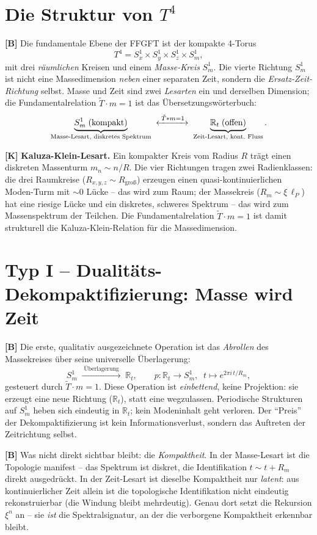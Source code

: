 \section{Die Struktur von $T^4$}

\textbf{[B]} Die fundamentale Ebene der FFGFT ist der kompakte 4-Torus
\[
  T^4 = S^1_x\times S^1_y\times S^1_z\times S^1_m,
\]
mit drei \emph{räumlichen} Kreisen und einem \emph{Masse-Kreis} $S^1_m$. Die
vierte Richtung $S^1_m$ ist nicht eine Massedimension \emph{neben} einer
separaten Zeit, sondern die \emph{Ersatz-Zeit-Richtung} selbst. Masse und Zeit
sind zwei \emph{Lesarten} ein und derselben Dimension; die Fundamentalrelation
$\tilde T\cdot m=1$ ist das Übersetzungswörterbuch:
\[
  \underbrace{S^1_m\;(\text{kompakt})}_{\text{Masse-Lesart, diskretes Spektrum}}
  \;\xleftrightarrow{\;\tilde T\cdot m=1\;}\;
  \underbrace{\mathbb{R}_t\;(\text{offen})}_{\text{Zeit-Lesart, kont.\ Fluss}}.
\]

\textbf{[K]} \textbf{Kaluza-Klein-Lesart.} Ein kompakter Kreis vom Radius $R$
trägt einen diskreten Massenturm $m_n\sim n/R$. Die vier Richtungen tragen zwei
Radienklassen: die drei Raumkreise ($R_{x,y,z}\sim R_\text{groß}$) erzeugen einen
quasi-kontinuierlichen Moden-Turm mit $\sim0$ Lücke -- das wird zum Raum; der
Massekreis ($R_m\sim\xi\,\ell_P$) hat eine riesige Lücke und ein diskretes,
schweres Spektrum -- das wird zum Massenspektrum der Teilchen. Die
Fundamentalrelation $\tilde T\cdot m=1$ ist damit strukturell die
Kaluza-Klein-Relation für die Massedimension.

\section{Typ I -- Dualitäts-Dekompaktifizierung: Masse wird Zeit}

\textbf{[B]} Die erste, qualitativ ausgezeichnete Operation ist das \emph{Abrollen}
des Massekreises über seine universelle Überlagerung:
\[
  S^1_m\;\xrightarrow{\;\text{Überlagerung}\;}\;\mathbb{R}_t,
  \qquad p:\mathbb{R}_t\to S^1_m,\;\;t\mapsto e^{2\pi i\,t/R_m},
\]
gesteuert durch $\tilde T\cdot m=1$. Diese Operation ist \emph{einbettend}, keine
Projektion: sie erzeugt eine neue Richtung ($\mathbb{R}_t$), statt eine
wegzulassen. Periodische Strukturen auf $S^1_m$ heben sich eindeutig in
$\mathbb{R}_t$; kein Modeninhalt geht verloren. Der \enquote{Preis} der
Dekompaktifizierung ist kein Informationsverlust, sondern das Auftreten der
Zeitrichtung selbst.

\textbf{[B]} Was nicht direkt sichtbar bleibt: die \emph{Kompaktheit}. In der
Masse-Lesart ist die Topologie manifest -- das Spektrum ist diskret, die
Identifikation $t\sim t+R_m$ direkt ausgedrückt. In der Zeit-Lesart ist dieselbe
Kompaktheit nur \emph{latent}: aus kontinuierlicher Zeit allein ist die
topologische Identifikation nicht eindeutig rekonstruierbar (die Windung bleibt
mehrdeutig). Genau dort setzt die Rekursion $\xi^n$ an -- sie \emph{ist} die
Spektralsignatur, an der die verborgene Kompaktheit erkennbar bleibt.

